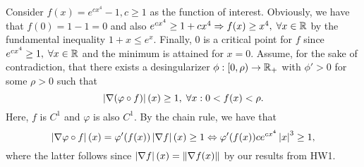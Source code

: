 \documentclass[10pt]{article}
\begin{document}
Consider $f(x) = e^{cx^4} - 1, c \geq 1$ as the function of interest.
Obviously, we have that $f(0) = 1 - 1  = 0$ and also $e^{cx^4} \geq 1 + cx^4
\Rightarrow f(x) \geq x^4, \; \forall x \in \mathbb{R}$ by the fundamental inequality
$1 + x \leq e^x$. Finally, $0$ is a critical point for $f$ since $e^{cx^4} \geq
1, \; \forall x \in \mathbb{R}$ and the minimum is attained for $x = 0$. Assume, for
the sake of contradiction, that there exists a desingularizer $\phi: [0, \rho)
\to \mathbb{R}_+$ with $\phi' > 0$ for some $\rho > 0$ such that
\[
    \left| \nabla (\varphi \circ f) \right|(x) \geq 1, \; \forall x: 0 < f(x)
    < \rho.
\]
Here, $f$ is $C^1$ and $\varphi$ is also $C^1$. By the chain rule, we have that
\[
    \left| \nabla \varphi \circ f \right|(x) = \varphi'(f(x) )\left| \nabla f \right|(x) \geq 1
    \Leftrightarrow \varphi'(f(x)) c e^{cx^4} \left| x \right|^3 \geq 1,
\]
where the latter follows since $\left| \nabla f \right|(x) = \left \| \nabla f(x) \right \|$ by our
results from HW1.
\end{document}
